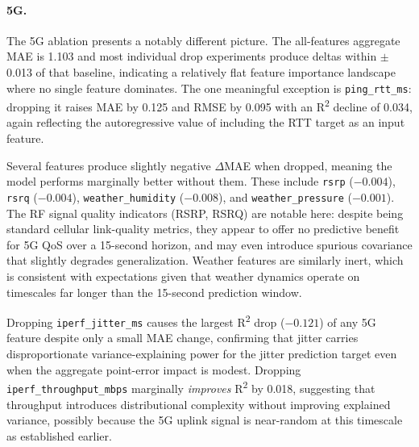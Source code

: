 \documentclass[12pt]{article}
\begin{document}
\paragraph{5G.}
The 5G ablation presents a notably different picture. The all-features aggregate MAE is 1.103 and most individual drop experiments produce deltas within $\pm$0.013 of that baseline, indicating a relatively flat feature importance landscape where no single feature dominates. The one meaningful exception is \texttt{ping\_rtt\_ms}: dropping it raises MAE by 0.125 and RMSE by 0.095 with an R\textsuperscript{2} decline of 0.034, again reflecting the autoregressive value of including the RTT target as an input feature.

Several features produce slightly negative $\Delta$MAE when dropped, meaning the model performs marginally better without them. These include \texttt{rsrp} ($-0.004$), \texttt{rsrq} ($-0.004$), \texttt{weather\_humidity} ($-0.008$), and \texttt{weather\_pressure} ($-0.001$). The RF signal quality indicators (RSRP, RSRQ) are notable here: despite being standard cellular link-quality metrics, they appear to offer no predictive benefit for 5G QoS over a 15-second horizon, and may even introduce spurious covariance that slightly degrades generalization. Weather features are similarly inert, which is consistent with expectations given that weather dynamics operate on timescales far longer than the 15-second prediction window.

Dropping \texttt{iperf\_jitter\_ms} causes the largest R\textsuperscript{2} drop ($-0.121$) of any 5G feature despite only a small MAE change, confirming that jitter carries disproportionate variance-explaining power for the jitter prediction target even when the aggregate point-error impact is modest. Dropping \texttt{iperf\_throughput\_mbps} marginally \emph{improves} R\textsuperscript{2} by 0.018, suggesting that throughput introduces distributional complexity without improving explained variance, possibly because the 5G uplink signal is near-random at this timescale as established earlier.
\end{document}

